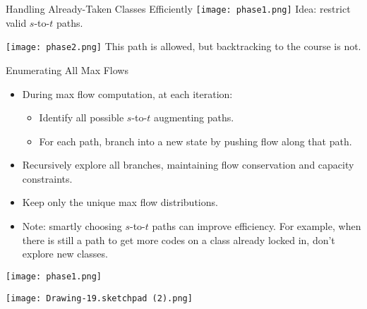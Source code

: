 \documentclass{beamer}
\begin{document}
\begin{frame}{Handling Already-Taken Classes Efficiently}
    \centering
    \texttt{[image: phase1.png]}
    \vspace{0.5cm}
    \small Idea: restrict valid \( s \)-to-\( t \) paths.
    
\end{frame}

\begin{frame}
    \centering
    \texttt{[image: phase2.png]}
    \vspace{0.5cm}
    \small This path is allowed, but backtracking to the course is not.
    
\end{frame}

\begin{frame}{Enumerating All Max Flows}
    \begin{itemize}
        \item During max flow computation, at each iteration:
        \begin{itemize}
            \item Identify all possible \( s \)-to-\( t \) augmenting paths.
            \item For each path, branch into a new state by pushing flow along that path.
        \end{itemize}
        \item Recursively explore all branches, maintaining flow conservation and capacity constraints.
        \item Keep only the unique max flow distributions.
        \item Note: smartly choosing \( s \)-to-\( t \) paths can improve efficiency. For example, when there is still a path to get more codes on a class already locked in, don't explore new classes. 
    \end{itemize}
    
\end{frame}

\begin{frame}{}
    \centering
    \texttt{[image: phase1.png]}
    \vspace{0.5cm}
    
\end{frame}

\begin{frame}{}
    \centering
    \texttt{[image: Drawing-19.sketchpad (2).png]}
    \vspace{0.5cm}
    
\end{frame}
\end{document}

